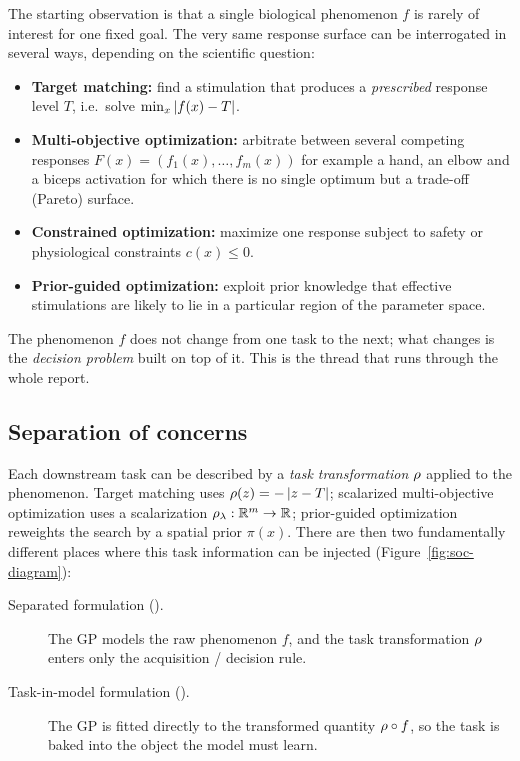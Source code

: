 The starting observation is that a single biological phenomenon $f$ is rarely of
interest for one fixed goal. The very same response surface can be interrogated
in several ways, depending on the scientific question:
\begin{itemize}
  \item \textbf{Target matching:} find a stimulation that produces a
        \emph{prescribed} response level $T$, i.e.\ solve
        $\min_x \left\lvert f(x)-T\right\rvert$.
  \item \textbf{Multi-objective optimization:} arbitrate between several
        competing responses $F(x)=(f_1(x),\dots,f_m(x))$ for example a hand,
        an elbow and a biceps activation for which there is no single
        optimum but a trade-off (Pareto) surface.
  \item \textbf{Constrained optimization:} maximize one response subject to
        safety or physiological constraints $c(x)\le 0$.
  \item \textbf{Prior-guided optimization:} exploit prior knowledge that
        effective stimulations are likely to lie in a particular region of the
        parameter space.
\end{itemize}
The phenomenon $f$ does not change from one task to the next; what changes is the
\emph{decision problem} built on top of it. This is the thread that runs through
the whole report.

\subsection{Separation of concerns}
\label{sec:intro-soc}

Each downstream task can be described by a \emph{task transformation} $\rho$
applied to the phenomenon. Target matching uses $\rho(z)=-\left\lvert z-T\right\rvert$;
scalarized multi-objective optimization uses a scalarization
$\rho_\lambda:\mathbb{R}^m\to\mathbb{R}$; prior-guided optimization reweights the search by a
spatial prior $\pi(x)$. There are then two fundamentally different places where
this task information can be injected (Figure~\ref{fig:soc-diagram}):
\begin{description}
  \item[Separated formulation (\RIGHT).] The GP models the raw phenomenon $f$,
        and the task transformation $\rho$ enters only the acquisition /
        decision rule.
  \item[Task-in-model formulation (\WRONG).] The GP is fitted directly to the
        transformed quantity $\rho\circ f$, so the task is baked into the object
        the model must learn.
\end{description}

